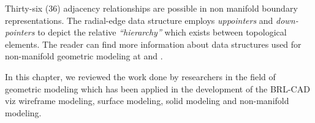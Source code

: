 \hspace{30} Thirty­-six   (36)   adjacency   relationships   are   possible   in   non ­manifold   boundary  
representations.   The   radial­-edge   data   structure   employs   \textit{up­pointers}   and  
\textit{down­pointers}   to   depict   the   relative   \textit{“hierarchy”}   which   exists   between   topological  
elements.   The   reader   can   find   more   information   about   data   structures   used   for  
non-­manifold geometric modeling at \cite{31} and \cite{32}. 
 
\hspace{30} In this chapter, we reviewed the work done by researchers in the field of  
geometric modeling which has been applied in the development of the BRL-­CAD viz 
wireframe modeling, surface modeling, solid modeling and non-­manifold modeling.  

\clearpage
